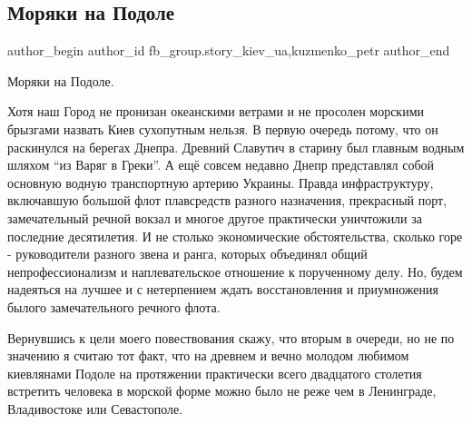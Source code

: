  
 
 
 
 
 
\subsection{Моряки на Подоле}
\label{sec:21_01_2021.fb.fb_group.story_kiev_ua.1.morjaki_na_podole}
 
\ifcmt
 author_begin
   author_id fb_group.story_kiev_ua,kuzmenko_petr
 author_end
\fi

Моряки на Подоле. 

Хотя наш Город не пронизан океанскими ветрами и не просолен морскими
брызгами назвать Киев сухопутным нельзя. В первую очередь потому, что он
раскинулся на берегах Днепра. Древний Славутич в старину был главным водным
шляхом \enquote{из Варяг в Греки}. А ещё совсем недавно Днепр представлял собой
основную водную транспортную артерию Украины. Правда инфраструктуру, включавшую
большой флот плавсредств разного назначения, прекрасный порт, замечательный
речной вокзал и многое другое практически уничтожили за последние десятилетия.
И не столько экономические обстоятельства, сколько горе - руководители разного
звена и ранга, которых объединял общий непрофессионализм и наплевательское
отношение к порученному делу. Но, будем надеяться на лучшее и с нетерпением
ждать восстановления и приумножения былого замечательного речного флота.

\raggedcolumns
\begin{multicols}{2} %
\setlength{\parindent}{0pt}


\end{multicols} %

Вернувшись к цели моего повествования скажу, что вторым в очереди, но не по
значению я считаю тот факт, что на древнем и вечно молодом любимом киевлянами
Подоле на протяжении практически всего двадцатого столетия встретить человека в
морской форме можно было не реже чем в Ленинграде, Владивостоке или
Севастополе. 

